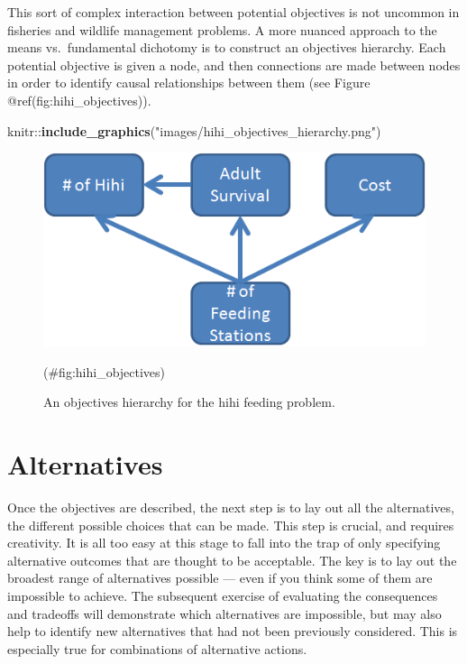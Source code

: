 \documentclass[]{book}
\newenvironment{Shaded}{\begin{snugshade}}{\end{snugshade}}
\newcommand{\KeywordTok}[1]{\textcolor[rgb]{0.13,0.29,0.53}{\textbf{{#1}}}}
\newcommand{\StringTok}[1]{\textcolor[rgb]{0.31,0.60,0.02}{{#1}}}
\newcommand{\NormalTok}[1]{{#1}}
\begin{document}
This sort of complex interaction between potential objectives is not
uncommon in fisheries and wildlife management problems. A more nuanced
approach to the means vs.~fundamental dichotomy is to construct an
objectives hierarchy. Each potential objective is given a node, and then
connections are made between nodes in order to identify causal
relationships between them (see Figure @ref(fig:hihi\_objectives)).

\begin{Shaded}
\begin{Highlighting}[]
\NormalTok{knitr::}\KeywordTok{include_graphics}\NormalTok{(}\StringTok{"images/hihi_objectives_hierarchy.png"}\NormalTok{)}
\end{Highlighting}
\end{Shaded}

\begin{figure}
\includegraphics[width=6.96in]{images/hihi_objectives_hierarchy} \caption{An objectives hierarchy for the hihi feeding problem.}(\#fig:hihi_objectives)
\end{figure}

\section{Alternatives}\label{alternatives}

Once the objectives are described, the next step is to lay out all the
alternatives, the different possible choices that can be made. This step
is crucial, and requires creativity. It is all too easy at this stage to
fall into the trap of only specifying alternative outcomes that are
thought to be acceptable. The key is to lay out the broadest range of
alternatives possible --- even if you think some of them are impossible
to achieve. The subsequent exercise of evaluating the consequences and
tradeoffs will demonstrate which alternatives are impossible, but may
also help to identify new alternatives that had not been previously
considered. This is especially true for combinations of alternative
actions.
\end{document}
